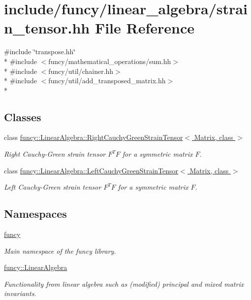 \hypertarget{strain__tensor_8hh}{\section{include/funcy/linear\-\_\-algebra/strain\-\_\-tensor.hh File Reference}
\label{strain__tensor_8hh}
}
{\ttfamily \#include \char`\"{}transpose.\-hh\char`\"{}}\\*
{\ttfamily \#include $<$funcy/mathematical\-\_\-operations/sum.\-hh$>$}\\*
{\ttfamily \#include $<$funcy/util/chainer.\-hh$>$}\\*
{\ttfamily \#include $<$funcy/util/add\-\_\-transposed\-\_\-matrix.\-hh$>$}\\*
\subsection*{Classes}
\begin{DoxyCompactItemize}
\item 
class \hyperlink{classfuncy_1_1LinearAlgebra_1_1RightCauchyGreenStrainTensor}{funcy\-::\-Linear\-Algebra\-::\-Right\-Cauchy\-Green\-Strain\-Tensor$<$ Matrix, class $>$}
\begin{DoxyCompactList}\small\item\em Right Cauchy-\/\-Green strain tensor $ F^T F $ for a symmetric matrix $ F $. \end{DoxyCompactList}\item 
class \hyperlink{classfuncy_1_1LinearAlgebra_1_1LeftCauchyGreenStrainTensor}{funcy\-::\-Linear\-Algebra\-::\-Left\-Cauchy\-Green\-Strain\-Tensor$<$ Matrix, class $>$}
\begin{DoxyCompactList}\small\item\em Left Cauchy-\/\-Green strain tensor $ F^T F $ for a symmetric matrix $ F $. \end{DoxyCompactList}\end{DoxyCompactItemize}
\subsection*{Namespaces}
\begin{DoxyCompactItemize}
\item 
\hyperlink{namespacefuncy}{funcy}
\begin{DoxyCompactList}\small\item\em Main namespace of the funcy library. \end{DoxyCompactList}\item 
\hyperlink{namespacefuncy_1_1LinearAlgebra}{funcy\-::\-Linear\-Algebra}
\begin{DoxyCompactList}\small\item\em Functionality from linear algebra such as (modified) principal and mixed matrix invariants. \end{DoxyCompactList}\end{DoxyCompactItemize}
